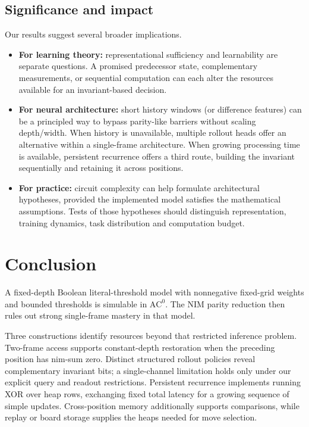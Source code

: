 \documentclass[11pt]{article}
\newcommand{\AC}{\mathrm{AC}}
\theoremstyle{plain}
\theoremstyle{definition}
\theoremstyle{remark}
\numberwithin{equation}{section}
\begin{document}
\subsection{Significance and impact}
Our results suggest several broader implications.

\begin{itemize}[leftmargin=*]
\item \textbf{For learning theory:} representational sufficiency and learnability are separate questions. A promised predecessor state, complementary measurements, or sequential computation can each alter the resources available for an invariant-based decision.
\item \textbf{For neural architecture:} short history windows (or difference features) can be a principled way to bypass parity-like barriers without scaling depth/width. When history is unavailable, multiple rollout heads offer an alternative within a single-frame architecture. When growing processing time is available, persistent recurrence offers a third route, building the invariant sequentially and retaining it across positions.
\item \textbf{For practice:} circuit complexity can help formulate architectural hypotheses, provided the implemented model satisfies the mathematical assumptions. Tests of those hypotheses should distinguish representation, training dynamics, task distribution and computation budget.
\end{itemize}


\section{Conclusion}
\label{sec:conclusion}
A fixed-depth Boolean literal-threshold model with nonnegative fixed-grid weights and bounded thresholds is simulable in $\AC^0$. The NIM parity reduction then rules out strong single-frame mastery in that model.

Three constructions identify resources beyond that restricted inference problem. Two-frame access supports constant-depth restoration when the preceding position has nim-sum zero. Distinct structured rollout policies reveal complementary invariant bits; a single-channel limitation holds only under our explicit query and readout restrictions. Persistent recurrence implements running XOR over heap rows, exchanging fixed total latency for a growing sequence of simple updates. Cross-position memory additionally supports comparisons, while replay or board storage supplies the heaps needed for move selection.
\end{document}

